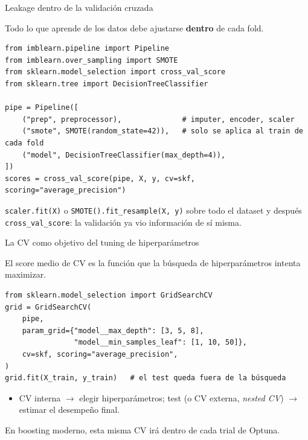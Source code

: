 \documentclass[aspectratio=169,12pt]{beamer}
\begin{document}
\begin{frame}[fragile]{Leakage dentro de la validación cruzada}
  \begin{center}
    Todo lo que aprende de los datos debe ajustarse \textbf{dentro} de cada fold.
  \end{center}
\begin{lstlisting}[basicstyle=\ttfamily\scriptsize,columns=fullflexible,keepspaces=true,xleftmargin=12pt]
from imblearn.pipeline import Pipeline
from imblearn.over_sampling import SMOTE
from sklearn.model_selection import cross_val_score
from sklearn.tree import DecisionTreeClassifier

pipe = Pipeline([
    ("prep", preprocessor),              # imputer, encoder, scaler
    ("smote", SMOTE(random_state=42)),   # solo se aplica al train de cada fold
    ("model", DecisionTreeClassifier(max_depth=4)),
])
scores = cross_val_score(pipe, X, y, cv=skf, scoring="average_precision")
\end{lstlisting}
  \begin{rulebox}[Incorrecto]
    \small \texttt{scaler.fit(X)} o \texttt{SMOTE().fit\_resample(X, y)} sobre todo el dataset y después \texttt{cross\_val\_score}: la validación ya vio información de sí misma.
  \end{rulebox}
\end{frame}

\begin{frame}[fragile]{La CV como objetivo del tuning de hiperparámetros}
  \begin{center}
    El score medio de CV es la función que la búsqueda de hiperparámetros intenta maximizar.
  \end{center}
\begin{lstlisting}[basicstyle=\ttfamily\scriptsize,columns=fullflexible,keepspaces=true]
from sklearn.model_selection import GridSearchCV
grid = GridSearchCV(
    pipe,
    param_grid={"model__max_depth": [3, 5, 8],
                "model__min_samples_leaf": [1, 10, 50]},
    cv=skf, scoring="average_precision",
)
grid.fit(X_train, y_train)   # el test queda fuera de la búsqueda
\end{lstlisting}
  \small
  \begin{itemize}
    \item CV interna $\rightarrow$ elegir hiperparámetros; test (o CV externa, \emph{nested CV}) $\rightarrow$ estimar el desempeño final.
  \end{itemize}
  \begin{rulebox}[Frontera]
    \small En boosting moderno, esta misma CV irá dentro de cada trial de Optuna.
  \end{rulebox}
\end{frame}
\end{document}
